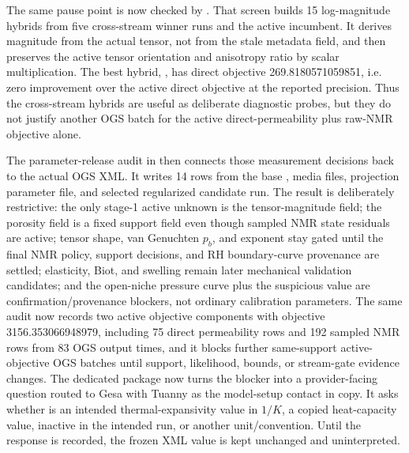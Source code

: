 The same pause point is now checked by
.
That screen builds 15 log-magnitude hybrids from five cross-stream winner runs and
the active incumbent.  It derives magnitude from the actual  tensor,
not from the stale  metadata field, and then preserves the active
tensor orientation and anisotropy ratio by scalar multiplication.  The best hybrid,
, has direct objective
269.8180571059851, i.e. zero improvement over the active direct objective at the
reported precision.  Thus the cross-stream hybrids are useful as deliberate
diagnostic probes, but they do not justify another OGS batch for the active
direct-permeability plus raw-NMR objective alone.

The parameter-release audit in
 then connects those
measurement decisions back to the actual OGS XML.  It writes 14 rows from the base
, media files, projection  parameter
file, and selected regularized candidate run.  The result is deliberately restrictive:
the only stage-1 active unknown is the  tensor-magnitude field; the
   porosity field is a fixed support field even though sampled NMR state
residuals are active; tensor shape, van Genuchten \(p_b\), and exponent stay gated
until the final NMR policy, support decisions, and RH boundary-curve provenance are
settled; elasticity, Biot, and swelling remain later mechanical validation
candidates; and the open-niche pressure curve plus the suspicious
 value are confirmation/provenance blockers, not ordinary calibration
parameters.  The same audit now records two active objective components with
objective 3156.353066948979, including 75 direct permeability rows and 192 sampled
NMR rows from 83 OGS output times, and it blocks further same-support active-objective
OGS batches until support, likelihood, bounds, or stream-gate evidence changes.
The dedicated  package now
turns the  blocker into a provider-facing question routed to Gesa with
Tuanny as the model-setup contact in copy.  It asks whether
 is an intended thermal-expansivity value in \(1/K\), a copied
 heat-capacity value, inactive in the intended run, or another
unit/convention.  Until the response is recorded, the frozen XML value is kept
unchanged and uninterpreted.

